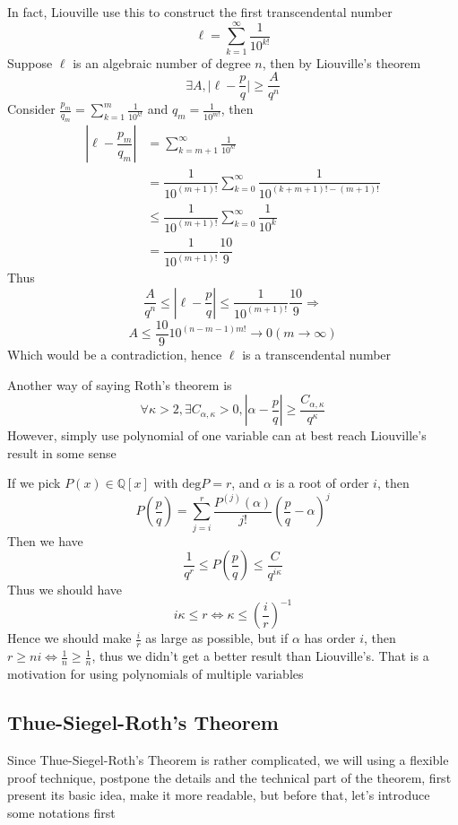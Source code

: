 In fact, Liouville use this to construct the first transcendental number
$$ \ell = \sum_{k=1}^{\infty}\dfrac{1}{10^{k!}} $$
Suppose $ \ell $ is an algebraic number of degree $ n $, then by Liouville's theorem 
$$ \exists A, \Big| \ell-\dfrac{p}{q} \Big| \geq \dfrac{A}{q^{n}} $$
Consider $ \frac{p_{m}}{q_{m}} = \sum_{k=1}^{m}\frac{1}{10^{k!}} $ and $ q_{m} = \frac{1}{10^{m!}} $, then
$$ 
\begin{aligned}
\left| \ell-\dfrac{p_{m}}{q_{m}} \right| 
&= \sum_{k=m+1}^{\infty}\frac{1}{10^{k!}} \\
&= \dfrac{1}{10^{(m+1)!}} \sum_{k=0}^{\infty} \dfrac{1}{10^{(k+m+1)!-(m+1)!}} \\
&\leq \dfrac{1}{10^{(m+1)!}} \sum_{k=0}^{\infty} \dfrac{1}{10^{k}} \\
&= \dfrac{1}{10^{(m+1)!}} \dfrac{10}{9} 
\end{aligned}
$$
Thus
$$ \dfrac{A}{q^{n}} \leq \left| \ell-\dfrac{p}{q} \right| \leq \dfrac{1}{10^{(m+1)!}} \dfrac{10}{9} \Rightarrow $$
$$ A \leq \dfrac{10}{9}10^{(n-m-1)m!} \rightarrow 0 (m \rightarrow \infty) $$
Which would be a contradiction, hence $ \ell $ is a transcendental number \par
Another way of saying Roth's theorem is 
$$ \forall \kappa > 2, \exists C_{\alpha,\kappa} > 0, 
\left| \alpha-\dfrac{p}{q} \right| \geq \dfrac{C_{\alpha,\kappa}}{q^{\kappa}} $$
However, simply use polynomial of one variable can at best reach Liouville's result in some sense \par
If we pick $ P(x) \in \mathbb{Q}[x] $ with $ \mathrm{deg} P = r $, and $ \alpha $ is a root of order $ i $, then 
$$ P\left( \dfrac{p}{q} \right) = \sum_{j=i}^{r}\dfrac{P^{(j)}(\alpha)}{j!}\left( \dfrac{p}{q}-\alpha \right)^{j} $$
Then we have
$$ \dfrac{1}{q^{r}} \leq P\left( \dfrac{p}{q} \right) \leq \dfrac{C}{q^{i\kappa}} $$
Thus we should have 
$$ i\kappa \leq r \Leftrightarrow \kappa \leq \left( \dfrac{i}{r} \right)^{-1} $$
Hence we should make $ \frac{i}{r} $ as large as possible, but if $ \alpha $ has order $ i $, then $ r \geq ni \Leftrightarrow \frac{1}{n} \geq \frac{1}{n} $, thus we didn't get a better result than Liouville's. That is a motivation for using polynomials of multiple variables

\subsection{Thue-Siegel-Roth's Theorem}

Since Thue-Siegel-Roth's Theorem is rather complicated, we will using a flexible proof technique, postpone the details and the technical part of the theorem, first present its basic idea, make it more readable, but before that, let's introduce some notations first

